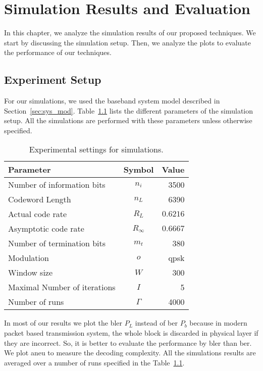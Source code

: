 \chapter{Simulation Results and Evaluation}\label{ch:simulation}
In this chapter, we analyze the simulation results of our proposed techniques. We start by discussing the simulation setup. Then, we analyze the plots to evaluate the performance of our techniques.

\section{Experiment Setup}
For our simulations, we used the baseband system model described in Section~\ref{sec:sys_mod}. Table~\ref{tab:sim_param} lists the different parameters of the simulation setup. All the simulations are performed with these parameters unless otherwise specified.
\begin{table}[htbp]
\centering
\begin{tabular}{|l|c|r|}
  \hline
  \textbf{Parameter} &\textbf{Symbol} &\textbf{Value}\\
  \hline
  \hline
  Number of information bits &$n_i$ &3500\\
  \hline
  Codeword Length &$n_L$ &6390\\
  \hline
  Actual code rate &$R_L$ &$0.6216$\\
  \hline
  Asymptotic code rate &$R_\infty$ &$0.6667$\\
  \hline
  Number of termination bits &$m_t$ &380\\
  \hline
  Modulation &$o$ &\gls{qpsk}\\
  \hline
  Window size &$W$ &300\\
  \hline
  Maximal Number of iterations &$I$ &5\\
  \hline
  Number of runs &$\Gamma$ &4000\\
  \hline
\end{tabular}
\caption{Experimental settings for simulations.}
\label{tab:sim_param}
\end{table}

In most of our results we plot the \acrfull{bler} $P_L$ instead of \acrfull{ber} $P_b$ because in modern packet based transmission system, the whole block is discarded in physical layer if they are incorrect. So, it is better to evaluate the performance by \gls{bler} than \gls{ber}. We plot \acrfull{aneu} to measure the decoding complexity. All the simulations results are averaged over a number of runs specified in the Table~\ref{tab:sim_param}.
